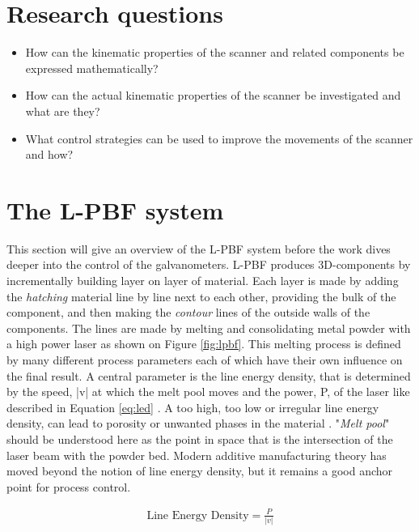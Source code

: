 \section{Research questions}

\begin{itemize}
    \item How can the kinematic properties of the scanner and related components be expressed mathematically?
    \item How can the actual kinematic properties of the scanner be investigated and what are they?
    \item What control strategies can be used to improve the movements of the scanner and how?
\end{itemize}

\section{The L-PBF system}

This section will give an overview of the L-PBF system before the work dives deeper into the control of the galvanometers. L-PBF produces 3D-components by incrementally building layer on layer of material. Each layer is made by adding the \textit{hatching} material line by line next to each other, providing the bulk of the component, and then making the \textit{contour} lines of the outside walls of the components. The lines are made by melting and consolidating metal powder with a high power laser as shown on Figure \ref{fig:lpbf}. This melting process is defined by many different process parameters each of which have their own influence on the final result. A central parameter is the line energy density, that is determined by the speed, |v| at which the melt pool moves and the power, P, of the laser like described in Equation \ref{eq:led} \cite[Eq. 2.1]{sebastian-phd}. A too high, too low or irregular line energy density, can lead to porosity or unwanted phases in the material \cite{energy-density}. "\textit{Melt pool}" should be understood here as the point in space that is the intersection of the laser beam with the powder bed. Modern additive manufacturing theory has moved beyond the notion of line energy density, but it remains a good anchor point for process control.

\begin{align}
    \text{Line Energy Density} = \frac{P}{|v|} \label{eq:led}
\end{align}

